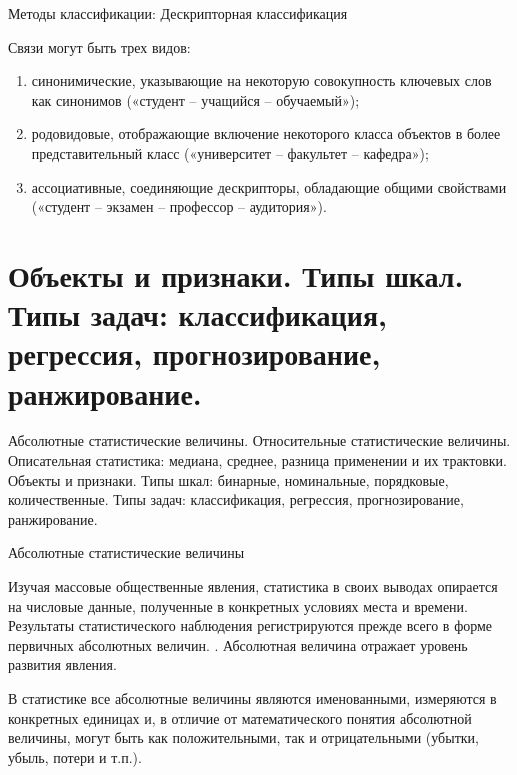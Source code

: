 \documentclass{beamer}
\begin{document}
\begin{frame}{Методы классификации: Дескрипторная классификация}

Связи могут быть трех видов:

\begin{enumerate}

\item  синонимические, указывающие на некоторую совокупность ключевых слов как 
синонимов («студент – учащийся – обучаемый»);
\item  родовидовые, отображающие включение некоторого класса объектов в более 
представительный класс («университет – факультет – кафедра»);
\item  ассоциативные, соединяющие дескрипторы, обладающие общими свойствами 
(«студент – экзамен – профессор – аудитория»).

\end{enumerate}

\end{frame}






\section{Объекты и признаки. Типы шкал. Типы задач: классификация, регрессия, прогнозирование, ранжирование.}


\begin{frame}

Абсолютные статистические величины. Относительные статистические величины. 
Описательная статистика: медиана, среднее, разница применении и их трактовки. Объекты и признаки. 
Типы шкал: бинарные, номинальные, порядковые, количественные. Типы задач: классификация, регрессия, прогнозирование, ранжирование.
\end{frame}

\begin{frame}{Абсолютные статистические величины} 

Изучая массовые общественные явления, статистика в своих выводах опирается на числовые данные, полученные в конкретных условиях места и времени. Результаты статистического наблюдения регистрируются прежде всего в форме первичных абсолютных величин. . Абсолютная величина отражает уровень развития явления.

В статистике все абсолютные величины являются именованными, измеряются в конкретных единицах и, в отличие от математического понятия абсолютной величины, могут быть как положительными, так и отрицательными (убытки, убыль, потери и т.п.).

\end{frame}
\end{document}
